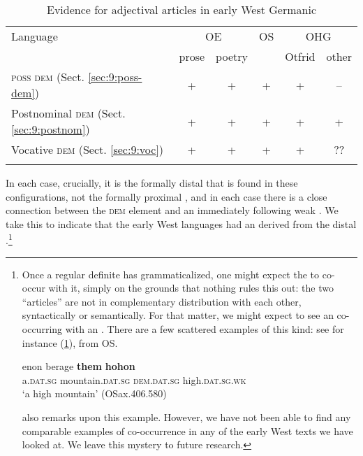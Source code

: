 \documentclass[output=paper,colorlinks,citecolor=brown]{langscibook}
\begin{document}
\begin{table}
    \begin{tabular}{lccccc}
    \lsptoprule
        Language & \multicolumn{2}{c}{OE} & OS & \multicolumn{2}{c}{OHG}\\\cmidrule(lr){2-3}\cmidrule(lr){5-6}
                 & prose & poetry &            & Otfrid & other\\
        \midrule
        \textsc{poss dem} (Sect. \ref{sec:9:poss-dem}) & + & + & + & + & – \\
        Postnominal \textsc{dem} (Sect. \ref{sec:9:postnom}) & + & + & + & + & + \\
        Vocative \textsc{dem} (Sect. \ref{sec:9:voc}) & + & + & + & + & ??\\
        \lspbottomrule
    \end{tabular}
    \caption{Evidence for adjectival articles in early West Germanic}
    \label{tab:wgmc}
\end{table}

In each case, crucially, it is the formally distal  that is found in these configurations, not the formally proximal , and in each case there is a close connection between the \textsc{dem} element and an immediately following weak . We take this to indicate that the early West  languages had an  derived from the distal .\footnote{Once a regular definite  has grammaticalized, one might expect the  to co-occur with it, simply on the grounds that nothing rules this out: the two ``articles'' are not in complementary distribution with each other, syntactically or semantically. For that matter, we might expect to see an   co-occurring with an . There are a few scattered examples of this kind: see for instance (\ref{ex:berg}), from OS.

    \begin{exe}     
        \ex\gll\label{ex:berg}enon berage \textbf{them} \textbf{hohon}\\
         a.\textsc{dat.sg} mountain.\textsc{dat.sg} \textsc{dem.dat.sg} high.\textsc{dat.sg.wk}\\
         \glt `a high mountain' (OSax.406.580)
    \end{exe}     

\citet{Heinrichs54} also remarks upon this example. However, we have not been able to find any comparable examples of co-occurrence in any of the early West  texts we have looked at. We leave this mystery to future research.}
\end{document}
